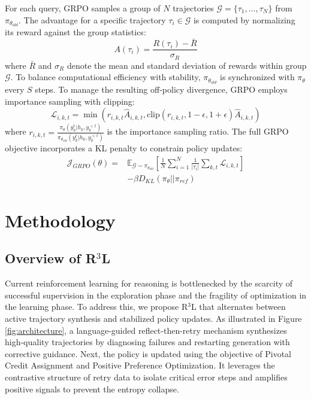 \documentclass[11pt]{article}
\begin{document}
For each query, GRPO samples a group of $N$ trajectories $\mathcal{G} = \{\tau_1, \ldots, \tau_N\}$ from $\pi_{\theta_{old}}$. The advantage for a specific trajectory $\tau_i \in \mathcal{G}$ is computed by normalizing its reward against the group statistics:
\begin{equation}
    A(\tau_i) = \frac{R(\tau_i) - \bar{R}}{\sigma_R}
    \label{eq:grpo_advantage}
\end{equation}
where $\bar{R}$ and $\sigma_R$ denote the mean and standard deviation of rewards within group $\mathcal{G}$.
To balance computational efficiency with stability, $\pi_{\theta_{old}}$ is synchronized with $\pi_{\theta}$ every $S$ steps. To manage the resulting off-policy divergence, GRPO employs importance sampling with clipping:
\begin{equation}
    \mathcal{L}_{i,k,t}\!\! =\!\! \min\! \! \left( \! r_{i,k,t} \hat{A}_{i,k,t},\! \text{clip}(r_{i,k,t}, \! 1 \!\!- \!\epsilon, \! 1 \!+\!\epsilon) \hat{A}_{i,k,t} \! \right)
\end{equation}
where $r_{i,k,t} = \frac{\pi_{\theta}(y_k^t | h_k, y_k^{<t})}{\pi_{\theta_{old}}(y_k^t | h_k, y_k^{<t})}$ is the importance sampling ratio. The full GRPO objective incorporates a KL penalty to constrain policy updates:
\begin{equation}
\begin{split}
    \mathcal{J}_{GRPO}(\theta) = &\mathbb{E}_{\mathcal{G} \sim \pi_{\theta_{old}}} \left[ \frac{1}{N} \sum_{i=1}^N \frac{1}{|\tau_i|} \sum_{k,t} \mathcal{L}_{i,k,t} \right] \\
    &- \beta D_{KL}(\pi_{\theta} || \pi_{ref})
\end{split}
\label{eq:grpo_full}
\end{equation}

\section{Methodology}
\subsection{Overview of R$^3$L}
Current reinforcement learning for reasoning is bottlenecked by the scarcity of successful supervision in the exploration phase and the fragility of optimization in the learning phase. To address this, we propose R$^3$L that alternates between active trajectory synthesis and stabilized policy updates. As illustrated in Figure \ref{fig:architecture}, a language-guided reflect-then-retry mechanism synthesizes high-quality trajectories by diagnosing failures and restarting generation with corrective guidance. Next, the policy is updated using the objective of Pivotal Credit Assignment and Positive Preference Optimization. It leverages the contrastive structure of retry data to isolate critical error steps and amplifies positive signals to prevent the entropy collapse.
\end{document}
